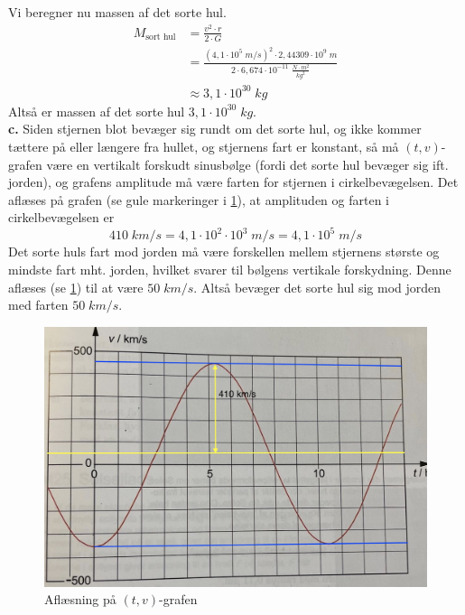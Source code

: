 \documentclass{report}
\begin{document}
Vi beregner nu massen af det sorte hul.
\begin{equation*}
\begin{split}
  M _{\text{sort hul} }&= \frac{v^2 \cdot r}{2 \cdot G}\\
  &=\frac{\left(4,1 \cdot 10^5 \;\unit{m/s} \right)^2 \cdot 2,44309 \cdot 10^9 \;\unit{m} }{2 \cdot 6,674 \cdot 10 ^{-11}\;\unit{\frac{N \cdot m^2}{kg^2}} }\\
  &\approx 3,1 \cdot 10 ^{30} \;\unit{kg} 
\end{split}
\end{equation*}
Altså er massen af det sorte hul $3,1 \cdot 10^{30} \;\unit{kg} $. \\[1ex]
\textbf{c.}
Siden stjernen blot bevæger sig rundt om det sorte hul, og ikke kommer tættere på eller længere fra hullet, og stjernens fart er konstant, så må $(t,v)$-grafen være en vertikalt forskudt sinusbølge (fordi det sorte hul bevæger sig ift. jorden), og grafens amplitude må være farten for stjernen i cirkelbevægelsen.
Det aflæses på grafen (se gule markeringer i \cref{fig:tv}), at amplituden og farten i cirkelbevægelsen er 
\[
410 \;\unit{km/s} = 4,1 \cdot 10^2 \cdot 10^3 \;\unit{m/s} =4,1 \cdot 10^5\;\unit{m/s} 
\] 
Det sorte huls fart mod jorden må være forskellen mellem stjernens største og mindste fart mht. jorden, hvilket svarer til bølgens vertikale forskydning.
Denne aflæses (se \cref{fig:tv}) til at være $50 \;\unit{km/s} $.
Altså bevæger det sorte hul sig mod jorden med farten $50 \;\unit{km/s} $.

\begin{figure}[H]
\begin{center}
  \includegraphics[scale=0.5]{vt.png}
\end{center}
  \caption{Aflæsning på $(t,v)$-grafen}
\label{fig:tv}
\end{figure}
\end{document}
